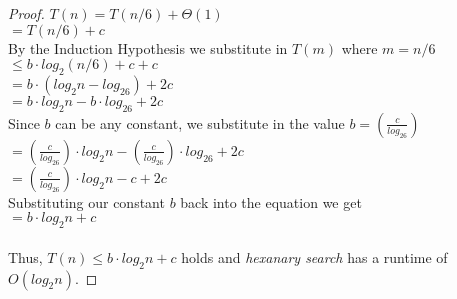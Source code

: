 \documentclass[11pt]{article}
\theoremstyle{nonumberplain}
\newtheorem{proof}{Proof}
\begin{document}
\begin{enumerate}
\begin{proof}
$T(n)=T(n/6)+\Theta(1)$ \\
\phantom{T(n) }$=T(n/6)+c$ \\
By the Induction Hypothesis we substitute in $T(m)$ where $m=n/6$ \\
\phantom{T(n) }$\le b \cdot log_2(n/6)+c+c$ \\
\phantom{T(n) }$=b \cdot (log_2n-log_26)+2c$ \\
\phantom{T(n) }$=b \cdot log_2n-b \cdot log_26+2c$ \\
Since $b$ can be any constant, we substitute in the value $b=\left(\frac{c}{log_26}\right)$ \\
\phantom{T(n) }$=\left(\frac{c}{log_26}\right) \cdot log_2n-\left(\frac{c}{log_26}\right) \cdot log_26+2c$ \\
\phantom{T(n) }$=\left(\frac{c}{log_26}\right) \cdot log_2n-c+2c$ \\
Substituting our constant $b$ back into the equation we get \\
\phantom{T(n) }$=b \cdot log_2n+c$ \\
\\
Thus, $T(n) \le b \cdot log_2n+c$ holds and \emph{hexanary search} has a runtime of $O(log_2n)$.
\end{proof}
\end{enumerate}
\end{document}
